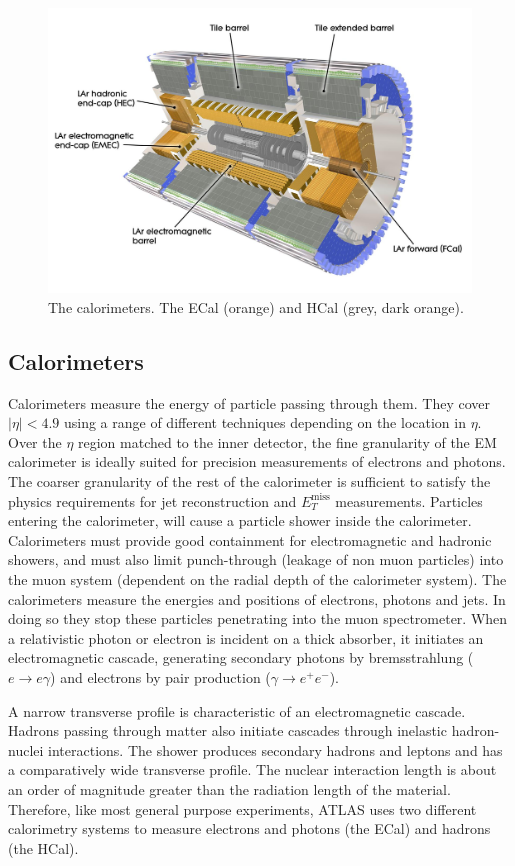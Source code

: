%
\begin{figure}[!htpb]
  \centering
  \includegraphics[width=0.4\linewidth]{chapters/2.detector/figs/atlas_calos.jpg}
  \caption{The \ATLAS calorimeters. The ECal (orange) and HCal (grey, dark orange).}
  \label{fig:atlas_calos}
\end{figure}
%



\subsection{Calorimeters}

Calorimeters measure the energy of particle passing through them. They cover $|\eta| < 4.9$ using a range of different techniques depending on the location in $\eta$. Over the $\eta$ region matched to the inner detector, the fine granularity of the EM calorimeter is ideally suited for precision measurements of electrons and photons. The coarser granularity of the rest of the calorimeter is sufficient to satisfy the physics requirements for jet reconstruction and $E_T^{\textrm{miss}}$ measurements. Particles entering the calorimeter, will cause a particle shower inside the calorimeter. Calorimeters must provide good containment for electromagnetic and hadronic showers, and must also limit punch-through (leakage of non muon particles) into the muon system (dependent on the radial depth of the calorimeter system). The calorimeters measure the energies and positions of electrons, photons and jets. In doing so they stop these particles penetrating into the muon spectrometer. When a relativistic photon or electron is incident on a thick absorber, it initiates an electromagnetic cascade, generating secondary photons by bremsstrahlung ($e \rightarrow e\gamma$) and electrons by pair production ($\gamma \rightarrow e^+ e^- $).
    
A narrow transverse profile is characteristic of an electromagnetic cascade. Hadrons passing through matter also initiate cascades through inelastic hadron-nuclei interactions. The shower produces secondary hadrons and leptons and has a comparatively wide transverse profile. The nuclear interaction length is about an order of magnitude greater than the radiation length of the material. Therefore, like most general purpose experiments, ATLAS uses two different calorimetry systems to measure electrons and photons (the ECal) and hadrons (the HCal). 

